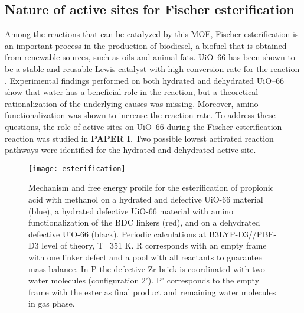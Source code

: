 \subsection{Nature of active sites for Fischer esterification}
 Among the reactions that can be catalyzed by this MOF, Fischer esterification is an important process in the production of biodiesel, a biofuel that is obtained from renewable sources, such as oils and animal fats. UiO--66 has been shown to be a stable and reusable Lewis catalyst with high conversion rate for the reaction \cite{cirujano2015conversion, cirujano2015zirconium}. Experimental findings performed on both hydrated and dehydrated UiO--66 show that water has a beneficial role in the reaction, but a theoretical rationalization of the underlying causes was missing. Moreover, amino functionalization was shown to increase the reaction rate. To address these questions, the role of active sites on UiO--66 during the Fischer esterification reaction was studied in \textbf{PAPER I}. Two possible lowest activated reaction pathways were identified for the hydrated and dehydrated active site. \\
\begin{figure}[!htbp]
	\centering
	\texttt{[image: esterification]}
	\caption{Mechanism and free energy profile for the esterification of propionic acid with methanol on a hydrated and defective UiO-66 material (blue), a hydrated defective UiO-66 material with amino functionalization of the BDC linkers (red), and on a dehydrated defective UiO-66 (black). Periodic calculations at B3LYP-D3//PBE-D3 level of theory, T=351 K. R corresponds with an empty frame with one linker defect and a pool with all reactants to guarantee mass balance. In P the defective Zr-brick is coordinated with two water molecules (configuration 2’). P’ corresponds to the empty frame with the ester as final product and remaining water molecules in gas phase.}
	\label{fig:esterification}
\end{figure}

